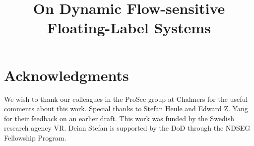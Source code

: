 \documentclass[10pt, conference, compsocconf, letterpaper]{IEEEtran}
\newif\ifextended
\begin{document}
\title{On Dynamic Flow-sensitive Floating-Label Systems}
\ifextended
\subtitle{Extended Version}

\fi

\author{
\and
{}
\and
{}
\and
{}
}


\maketitle













\section*{Acknowledgments}
We wish to thank our colleagues in the ProSec group at Chalmers for the useful
comments about this work. Special thanks to Stefan Heule and Edward Z. Yang for
their feedback on an earlier draft. This work was funded by the Swedish research
agency VR. Deian Stefan is supported by the DoD through the NDSEG Fellowship
Program.

{\frenchspacing


}

\end{document}
